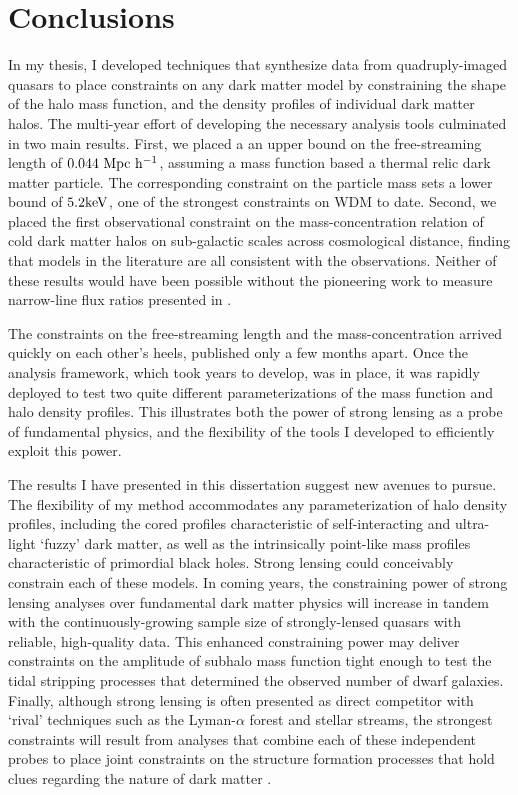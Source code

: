 \chapter{Conclusions}

In my thesis, I developed techniques that synthesize data from quadruply-imaged quasars to place constraints on any dark matter model by constraining the shape of the halo mass function, and the density profiles of individual dark matter halos. The multi-year effort of developing the necessary analysis tools culminated in two main results. First, we placed a an upper bound on the free-streaming length of $0.044 \ \rm{Mpc} \ h^{-1}$, assuming a mass function based a thermal relic dark matter particle. The corresponding constraint on the particle mass sets a lower bound of $5.2 \rm{keV}$, one of the strongest constraints on WDM to date. Second, we placed the first observational constraint on the mass-concentration relation of cold dark matter halos on sub-galactic scales across cosmological distance, finding that models in the literature are all consistent with the observations. Neither of these results would have been possible without the pioneering work to measure narrow-line flux ratios presented in \cite{Nierenberg++19}. 

The constraints on the free-streaming length and the mass-concentration arrived quickly on each other's heels, published only a few months apart. Once the analysis framework, which took years to develop, was in place, it was rapidly deployed to test two quite different parameterizations of the mass function and halo density profiles. This illustrates both the power of strong lensing as a probe of fundamental physics, and the flexibility of the tools I developed to efficiently exploit this power. 

The results I have presented in this dissertation suggest new avenues to pursue. The flexibility of my method accommodates any parameterization of halo density profiles, including the cored profiles characteristic of self-interacting and ultra-light `fuzzy' dark matter, as well as the intrinsically point-like mass profiles characteristic of primordial black holes. Strong lensing could conceivably constrain each of these models. In coming years, the constraining power of strong lensing analyses over fundamental dark matter physics will increase in tandem with the continuously-growing sample size of strongly-lensed quasars with reliable, high-quality data. This enhanced constraining power may deliver constraints on the amplitude of subhalo mass function tight enough to test the tidal stripping processes that determined the observed number of dwarf galaxies. Finally, although strong lensing is often presented as direct competitor with `rival' techniques such as the Lyman-$\alpha$ forest and stellar streams, the strongest constraints will result from analyses that combine each of these independent probes to place joint constraints on the structure formation processes that hold clues regarding the nature of dark matter . 
